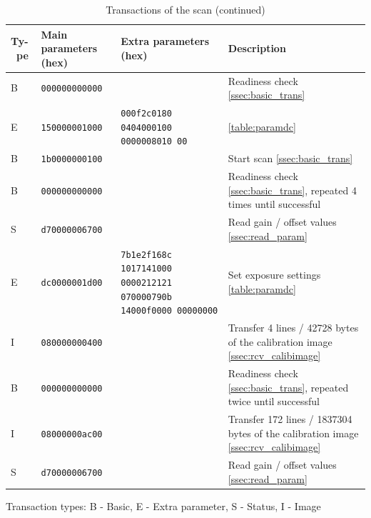 \documentclass{article}
\begin{document}
\begin{table}[H]
  \caption{Transactions of the scan (continued)}
  \centering
  \begin{tabular}{p{0.4cm} | p{2.3cm} | p{2cm} | p{5cm}}
    Ty-\ pe & Main parameters (hex) & Extra parameters (hex) & Description \\ \hline
    B & {\tt 000000000000} &  & Readiness check \ref{ssec:basic_trans} \\
    E & {\tt 150000001000} & \tt 000f2c0180 0404000100 0000008010 00 & \autoref{table:paramdc} \\
    B & {\tt 1b0000000100} &  & Start scan \ref{ssec:basic_trans} \\
    B & {\tt 000000000000} &  & Readiness check \ref{ssec:basic_trans}, repeated 4 times until successful \\ 
    S & {\tt d70000006700} &  & Read gain / offset values \ref{ssec:read_param} \\
    E & {\tt dc0000001d00} & \tt 7b1e2f168c 1017141000 0000212121 070000790b 14000f0000 00000000
                           & Set exposure settings \autoref{table:paramdc} \\
    I & {\tt 080000000400} &  & Transfer 4 lines / 42728 bytes of the calibration image \ref{ssec:rcv_calibimage} \\
    B & {\tt 000000000000} &  & Readiness check \ref{ssec:basic_trans}, repeated twice until successful \\
    I & {\tt 08000000ac00} &  & Transfer 172 lines / 1837304 bytes of the calibration image \ref{ssec:rcv_calibimage}  \\
    S & {\tt d70000006700} &  & Read gain / offset values \ref{ssec:read_param} \\
  \end{tabular}
  
  \vspace{5mm} Transaction types: B - Basic, E - Extra parameter,
               S - Status, I - Image
\end{table}
\end{document}
